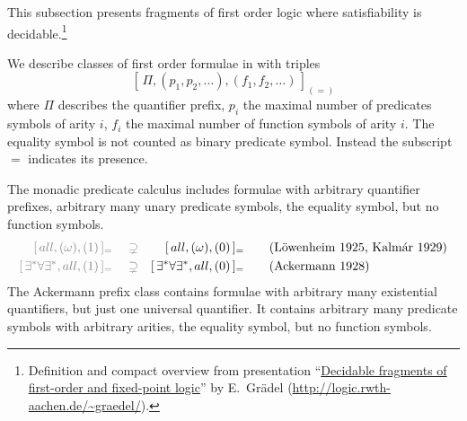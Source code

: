 
This subsection presents fragments of first order logic where satisfiability is decidable.\footnote{
	Definition and compact overview from presentation
	“\href{http://logic.rwth-aachen.de/~graedel/kalmar.pdf}{Decidable fragments of first-order and fixed-point logic}”
	by E.~Grädel (\url{http://logic.rwth-aachen.de/~graedel/}).	
}  


\begin{definition}\label{def:prefix:class}
	We describe classes of first order formulae in \PNF with triples
	\[
		[\, \Pi, (p_1,p_2,\ldots), (f_1,f_2,\ldots)\,]_{(=)}
	\]
	where $\Pi$ describes the quantifier prefix,
	$p_i$ the maximal number of predicates symbols of arity $i$,
	$f_i$ the maximal number of function symbols of arity $i$.
	The equality symbol is not counted as binary predicate symbol.
	Instead the subscript $=$ indicates its presence.
	
\end{definition}

\begin{example}
	The monadic predicate calculus includes formulae with arbitrary quantifier prefixes, 
	arbitrary many unary predicate symbols, the equality symbol, but no function symbols.
	\begin{align*}
	\colG [\,all, (\omega), (1)\,]_= 
	\quad\supsetneq& &
		[\,all, (\omega), (0 )&\,]_=
		 \tag{Löwenheim 1925, Kalmár 1929}
	\\
	\colG [\,\exists^*\forall\exists^*,all,(1)\,]_=
	\quad\supsetneq& &
	[\,\exists^*\forall\exists^*,all,(0)&\,]_{=} \tag{Ackermann 1928}
	\end{align*}
	The Ackermann prefix class contains formulae with arbitrary many existential quantifiers, 
	but just one universal quantifier. It contains arbitrary many predicate symbols
	with arbitrary arities, the equality symbol, but no function symbols. 
\end{example}


